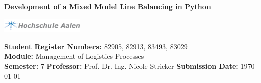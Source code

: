 \begin{center}
	
	\vspace{\baselineskip}
	
	
	\textbf{Development of a Mixed Model Line Balancing in Python}%
	
	\vspace{\baselineskip}
	
	
	\includegraphics[width=0.3\textwidth,  trim={0 0 162 0},clip]{HS_Logo.png}
	
	
\end{center}


\begin{flushleft}
	
	\vfill
	\textbf{Student Register Numbers: } 82905, 82913, 83493, 83029\\
	\textbf{Module: }Management of Logistics Processes\\
	\textbf{Semester: } 7 \linebreak
	\textbf{Professor:} Prof. Dr.-Ing. Nicole Stricker
	\linebreak \linebreak
	\textbf{Submission Date: }\today
	
\end{flushleft}

